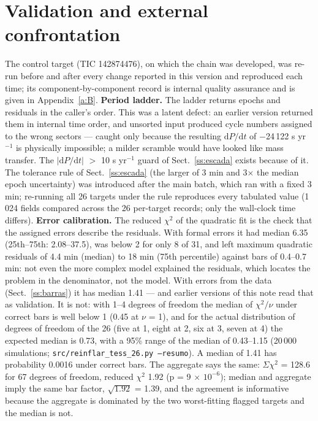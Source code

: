 \documentclass{aa}
\begin{document}
\section{Validation and external confrontation}\label{s:val}
The control target (TIC 142874476), on which the chain was developed, was re-run before and after every change reported in this version and reproduced each time; its component-by-component record is internal quality assurance and is given in Appendix~\ref{a:B}.
\textbf{Period ladder.} The ladder returns epochs and residuals in the caller's order. This was a latent defect: an earlier version returned them in internal time order, and unsorted input produced cycle numbers assigned to the wrong sectors --- caught only because the resulting $\mathrm{d}P/\mathrm{d}t$ of $-$24\,122 s yr$^{-1}$ is physically impossible; a milder scramble would have looked like mass transfer. The $|\mathrm{d}P/\mathrm{d}t|$ $>$ 10 s yr$^{-1}$ guard of Sect.~\ref{ss:escada} exists because of it. The tolerance rule of Sect.~\ref{ss:escada} (the larger of 3 min and 3$\times$ the median epoch uncertainty) was introduced after the main batch, which ran with a fixed 3 min; re-running all 26 targets under the rule reproduces every tabulated value (1\,024 fields compared across the 26 per-target records; only the wall-clock time differs).
\textbf{Error calibration.} The reduced $\chi^2$ of the quadratic fit is the check that the assigned errors describe the residuals. With formal errors it had median 6.35 (25th--75th: 2.08--37.5), was below 2 for only 8 of 31, and left maximum quadratic residuals of 4.4 min (median) to 18 min (75th percentile) against bars of 0.4--0.7 min: not even the more complex model explained the residuals, which locates the problem in the denominator, not the model. With errors from the data (Sect.~\ref{ss:barras}) it has median 1.41 --- and earlier versions of this note read that as validation. It is not: with 1--4 degrees of freedom the median of $\chi^2/\nu$ under correct bars is well below 1 (0.45 at $\nu$ = 1), and for the actual distribution of degrees of freedom of the 26 (five at 1, eight at 2, six at 3, seven at 4) the expected median is 0.73, with a 95\% range of the median of 0.43--1.15 (20\,000 simulations; \texttt{src/reinflar\_tess\_26.py --resumo}). A median of 1.41 has probability 0.0016 under correct bars. The aggregate says the same: $\Sigma\chi^2$ = 128.6 for 67 degrees of freedom, reduced $\chi^2$ 1.92 (p = 9 $\times$ $10^{-6}$); median and aggregate imply the same bar factor, $\sqrt{1.92}$ = 1.39, and the agreement is informative because the aggregate is dominated by the two worst-fitting flagged targets and the median is not.
\end{document}
